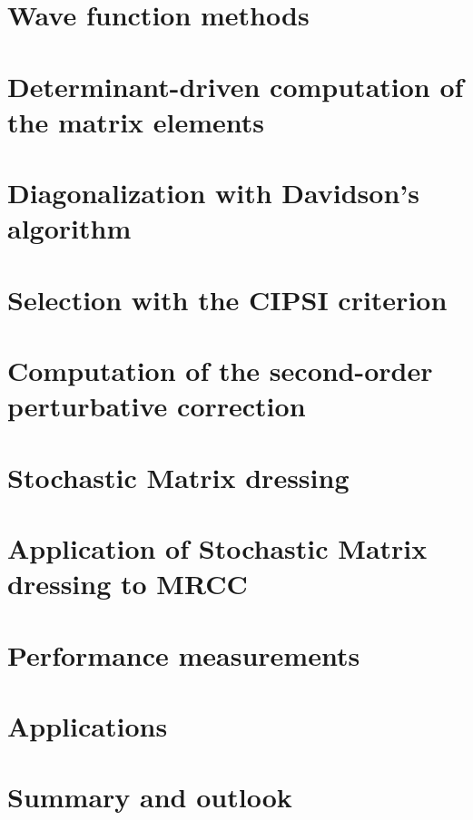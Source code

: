 \documentclass[12pt,a4paper]{report}
\begin{document}
\chapter{Wave function methods}
\minitoc


\chapter{Determinant-driven computation of the matrix elements}
\minitoc


\chapter{Diagonalization with Davidson's algorithm}
\minitoc


\chapter{Selection with the CIPSI criterion}
\minitoc


\chapter{Computation of the second-order perturbative correction}
\minitoc


\chapter{Stochastic Matrix dressing}
\minitoc


\chapter{Application of Stochastic Matrix dressing to MRCC}
\minitoc


\chapter{Performance measurements}
\minitoc


\chapter{Applications}
\minitoc


\chapter{Summary and outlook}
\end{document}

